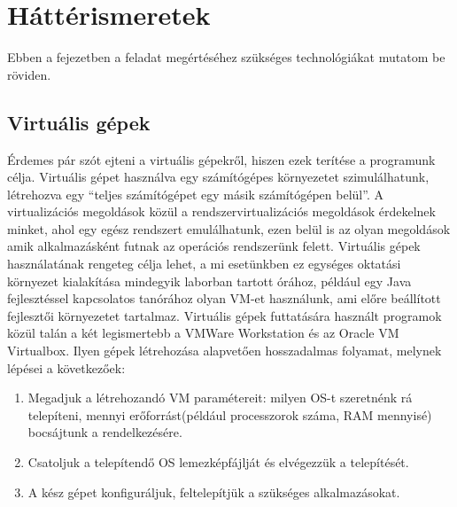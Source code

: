 \chapter{Háttérismeretek}
\label{chp:background}
Ebben a fejezetben a feladat megértéséhez szükséges technológiákat mutatom be röviden.

\section{Virtuális gépek}
Érdemes pár szót ejteni a virtuális gépekről, hiszen ezek terítése a programunk célja. Virtuális gépet használva egy számítógépes környezetet szimulálhatunk, létrehozva egy ``teljes számítógépet egy másik számítógépen belül''. A virtualizációs megoldások közül a rendszervirtualizációs megoldások érdekelnek minket, ahol egy egész rendszert emulálhatunk, ezen belül is az olyan megoldások amik alkalmazásként futnak az operációs rendszerünk felett. Virtuális  gépek használatának rengeteg célja lehet, a mi esetünkben ez egységes oktatási környezet kialakítása mindegyik laborban tartott órához, például egy Java fejlesztéssel kapcsolatos tanórához olyan VM-et használunk, ami előre beállított fejlesztői környezetet tartalmaz.
Virtuális gépek futtatására használt programok közül talán a két legismertebb a VMWare Workstation\cite{vmware} és az Oracle VM Virtualbox\cite{virtualbox}. Ilyen gépek létrehozása alapvetően hosszadalmas folyamat, melynek lépései a következőek:

\begin{enumerate}
  \item Megadjuk a létrehozandó VM paramétereit: milyen OS-t szeretnénk rá telepíteni, mennyi erőforrást(például processzorok száma, RAM mennyisé) bocsájtunk a rendelkezésére.
  \item	Csatoljuk a telepítendő OS lemezképfájlját és elvégezzük a telepítését.
  \item A kész gépet konfiguráljuk, feltelepítjük a szükséges alkalmazásokat.
\end{enumerate}

